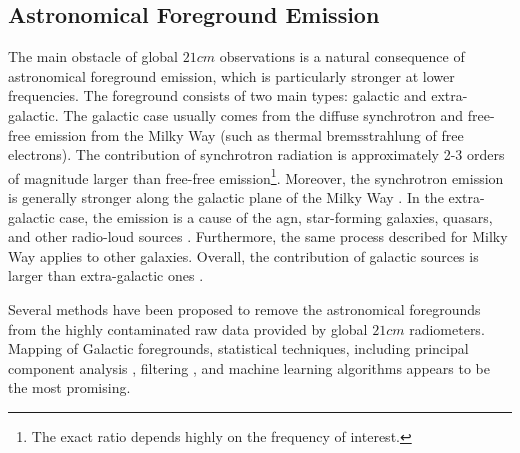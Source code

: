\documentclass[12pt, TexShade, letterpaper]{report}
\begin{document}
\subsection{Astronomical Foreground Emission}
The main obstacle of global $21cm$ observations is a natural consequence of astronomical foreground emission, which is particularly stronger at lower frequencies. The foreground consists of two main types: galactic and extra-galactic. The galactic case usually comes from the diffuse synchrotron and free-free emission from the Milky Way (such as thermal bremsstrahlung of free electrons). The contribution of synchrotron radiation is approximately 2-3 orders of magnitude larger than free-free emission\footnote{The exact ratio depends highly on the frequency of interest.}. Moreover, the synchrotron emission is generally stronger along the galactic plane of the Milky Way \cite{thesis_shedding, thesis_pamela, pritchard_mcmc, reionization_old}.
In the extra-galactic case, the emission is a cause of the \gls{agn}, star-forming galaxies, quasars, and other radio-loud sources \cite{book_21cm}. Furthermore, the same process described for Milky Way applies to other galaxies. Overall, the contribution of galactic sources is larger than extra-galactic ones \cite{pritchard_mcmc, reionization_old}.\par

Several methods have been proposed to remove the astronomical foregrounds from the highly contaminated raw data provided by global $21cm$ radiometers. Mapping of Galactic foregrounds, statistical techniques, including principal component analysis \cite{principal_component}, filtering \cite{filtering}, and machine learning algorithms \cite{removal_deep_learning, signal_reconstruction, signal_extraction, extract_foreground, pritchard_mcmc} appears to be the most promising\cite{thesis_pamela}.\par
\end{document}
